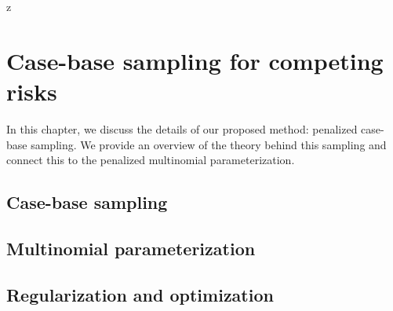 z\chapter{Case-base sampling for competing risks}
\label{ch:chpapter3}

In this chapter, we discuss the details of our proposed method: penalized case-base sampling. We provide an overview of the theory behind this sampling and connect this to the penalized multinomial parameterization.


\section{Case-base sampling}

\section{Multinomial parameterization}

\section{Regularization and optimization}
